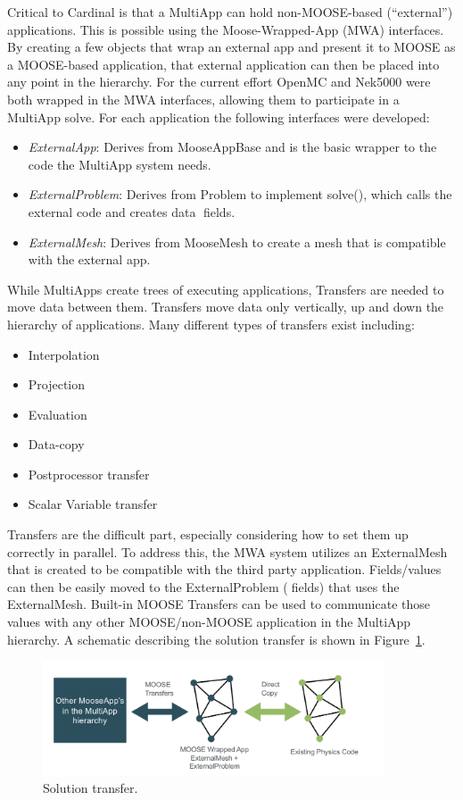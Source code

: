 Critical to Cardinal is that a MultiApp can hold non-MOOSE-based (``external'') applications. This is possible using the Moose-Wrapped-App (MWA) interfaces. By creating a few objects that wrap an external app and present it to MOOSE as a MOOSE-based application, that external application can then be placed into any point in the hierarchy. For the current effort OpenMC and Nek5000 were both wrapped in the MWA interfaces, allowing them to participate in a MultiApp solve. For each application the following interfaces were developed:
\begin{itemize}
    \item \textit{ExternalApp}: Derives from MooseAppBase and is the basic wrapper to the code the MultiApp
    system needs.
    \item \textit{ExternalProblem}: Derives from Problem to implement solve(), which calls the external code and creates
    data fields.
    \item \textit{ExternalMesh}: Derives from MooseMesh to create a mesh that is compatible with the external app.
\end{itemize}
While MultiApps create trees of executing applications, Transfers are needed to move data between them. Transfers move data only vertically, up and down the hierarchy of applications. Many different types of transfers exist including:
\begin{itemize}
  \item Interpolation
  \item Projection
  \item Evaluation
  \item Data-copy
  \item Postprocessor transfer
  \item Scalar Variable transfer
\end{itemize}
Transfers are the difficult part, especially considering how to set them up correctly in parallel. To address this, the MWA system utilizes an ExternalMesh that is created to be compatible with the third party application. Fields/values can then be easily moved to the ExternalProblem (fields) that uses the ExternalMesh. Built-in MOOSE Transfers can be used to communicate those values with any other MOOSE/non-MOOSE application in the MultiApp hierarchy. A schematic describing the solution transfer is shown in Figure~\ref{f:moose2}.

\begin{figure}[!h]
\centering
\includegraphics[clip=true,width=0.9\textwidth]{Figures/moose2}
\caption{Solution transfer.}
\label{f:moose2}
\end{figure}

